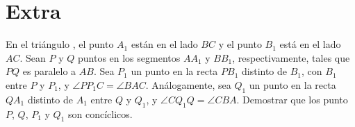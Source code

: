 \section{Extra}

\begin{section-problem}
    En el triángulo , el punto $A_1$ están en el lado $BC$ y el punto $B_1$ está en el lado $AC$.
    Sean $P$ y $Q$ puntos en los segmentos $AA_1$ y $BB_1$, respectivamente, tales que $PQ$ es paralelo a $AB$.
    Sea $P_1$ un punto en la recta $PB_1$ distinto de $B_1$, con $B_1$ entre $P$ y $P_1$, y $\angle PP_1 C = \angle BAC$.
    Análogamente, sea $Q_1$ un punto en la recta $QA_1$ distinto de $A_1$ entre $Q$ y $Q_1$, y $\angle C Q_1 Q = \angle CBA$.
    Demostrar que los punto $P$, $Q$, $P_1$ y $Q_1$ son concíclicos.
\end{section-problem}